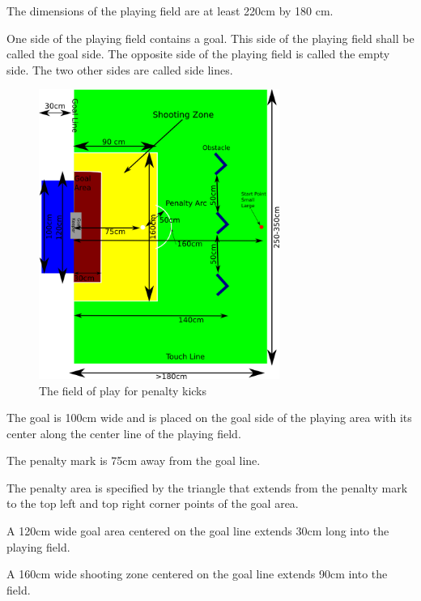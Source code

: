\documentclass[12pt]{hurocup}
\begin{document}
\begin{lawlist}[PK]

\item The dimensions of the playing field are at least 220cm by
  180 cm. 

\item One side of the playing field contains a goal. This side of the
  playing field shall be called the goal side. The opposite side of
  the playing field is called the empty side. The two other sides are
  called side lines.

  \begin{figure}
    \begin{center}
      \includegraphics[width=0.7\textwidth]{Figures/penalty-kick}
    \end{center}
    \caption{The field of play for penalty kicks}
    \label{fig:field-penalty}
  \end{figure}

\item The goal is 100cm wide and is placed on the goal side of the
  playing area with its center along the center line of the playing
  field.

\item The penalty mark is 75cm away from the goal line.

\item The penalty area is specified by the triangle that extends from
the penalty mark to the top left and top right corner points of the
goal area.

\item A 120cm wide goal area centered on the goal line extends 30cm
  long into the playing field.

\item A 160cm wide shooting zone centered on the goal line extends
  90cm into the field.
\end{lawlist}
\end{document}
